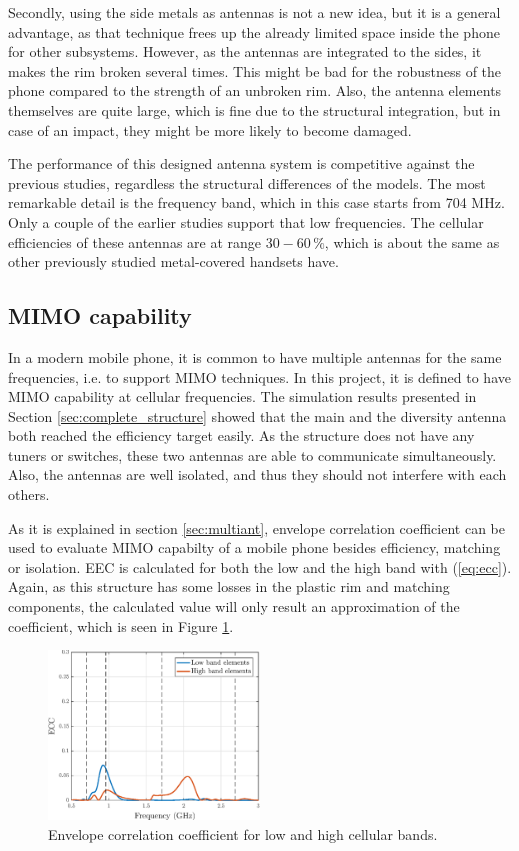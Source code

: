 Secondly, using the side metals as antennas is not a new idea, but it is a general advantage, as that technique frees up the already limited space inside the phone for other subsystems. However, as the antennas are integrated to the sides, it makes the rim broken several times. This might be bad for the robustness of the phone compared to the strength of an unbroken rim. Also, the antenna elements themselves are quite large, which is fine due to the structural integration, but in case of an impact, they might be more likely to become damaged.

The performance of this designed antenna system is competitive against the previous studies, regardless the structural differences of the models. The most remarkable detail is the frequency band, which in this case starts from 704 MHz. Only a couple of the earlier studies support that low frequencies. The cellular efficiencies of these antennas are at range $30-60\,\%$, which is about the same as other previously studied metal-covered handsets have. 


\subsection{MIMO capability}
\label{sec:mimo_cap}
In a modern mobile phone, it is common to have multiple antennas for the same frequencies, i.e. to support MIMO techniques. In this project, it is defined to have MIMO capability at cellular frequencies. The simulation results presented in Section \ref{sec:complete_structure} showed that the main and the diversity antenna both reached the efficiency target easily. As the structure does not have any tuners or switches, these two antennas are able to communicate simultaneously. Also, the antennas are well isolated, and thus they should not interfere with each others.

As it is explained in section \ref{sec:multiant}, envelope correlation coefficient can be used to evaluate MIMO capabilty of a mobile phone besides efficiency, matching or isolation. EEC is calculated for both the low and the high band with (\ref{eq:ecc}). Again, as this structure has some losses in the plastic rim and matching components, the calculated value will only result an approximation of the coefficient, which is seen in Figure \ref{fig:ecc}. 
\begin{figure}[H]
    \centering
    \includegraphics[width=0.5\textwidth]{img/ecc.eps}
    \caption{Envelope correlation coefficient for low and high cellular bands.}
    \label{fig:ecc}
\end{figure}

